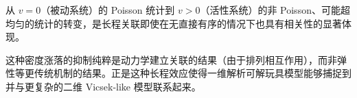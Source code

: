 \begin{notebox}[最终评论]
从 $v = 0$（被动系统）的 Poisson 统计到 $v > 0$（活性系统）的非 Poisson、可能超均匀的统计的转变，是长程关联即使在无直接有序的情况下也具有相关性的显著体现。

这种密度涨落的抑制纯粹是动力学建立关联的结果（由于排列相互作用），而非弹性等更传统机制的结果。正是这种长程效应使得一维解析可解玩具模型能够捕捉到并与更复杂的二维 Vicsek-like 模型联系起来。
\end{notebox}
